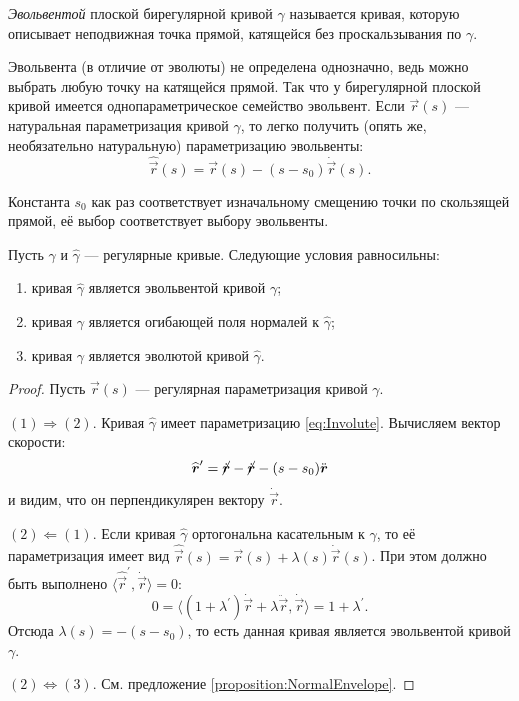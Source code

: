 \begin{definition}
	\textit{Эвольвентой} плоской бирегулярной кривой $\gamma$ называется кривая, которую описывает неподвижная точка прямой, катящейся без проскальзывания по $\gamma$.
\end{definition}

Эвольвента (в отличие от эволюты) не определена однозначно, ведь можно выбрать любую точку на катящейся прямой. Так что у бирегулярной плоской кривой имеется однопараметрическое семейство эвольвент. Если $\vec{r}(s)$ --- натуральная параметризация кривой $\gamma$, то легко получить (опять же, необязательно натуральную) параметризацию эвольвенты:
\begin{equation} \label{eq:Involute}
	\widehat{\vec{r}}(s) = \vec{r}(s) - (s - s_0)\dot{\vec{r}}(s).
\end{equation}

Константа $s_0$ как раз соответствует изначальному смещению точки по скользящей прямой, её выбор соответствует выбору эвольвенты.

\begin{theorem}
	Пусть $\gamma$ и $\widehat{\gamma}$ --- регулярные кривые. Следующие условия равносильны:
	\begin{enumerate}[nolistsep, label=(\arabic*)]
		\item кривая $\widehat{\gamma}$ является эвольвентой кривой $\gamma$;
		\item кривая $\gamma$ является огибающей поля нормалей к $\widehat{\gamma}$;
		\item кривая $\gamma$ является эволютой кривой $\widehat{\gamma}$.
	\end{enumerate}
\end{theorem}

\begin{proof}
	Пусть $\vec{r}(s)$ --- регулярная параметризация кривой $\gamma$.

	$(1) \Rightarrow (2)$. Кривая $\widehat{\gamma}$ имеет параметризацию \eqref{eq:Involute}. Вычисляем вектор скорости:
	\[
		\widehat{\vec{r}}^\prime = \cancel{\dot{\vec{r}}} - \cancel{\dot{\vec{r}}} - (s - s_0)\ddot{\vec{r}}
	\]
	и видим, что он перпендикулярен вектору $\dot{\vec{r}}$.

	$(2) \Leftarrow (1)$. Если кривая $\widehat{\gamma}$ ортогональна касательным к $\gamma$, то её параметризация имеет вид $\widehat{\vec{r}}(s) = \vec{r}(s) + \lambda(s)\dot{\vec{r}}(s)$. При этом должно быть выполнено $\langle\widehat{\vec{r}}^\prime, \dot{\vec{r}}\rangle = 0$:
	\[
		0 = \langle (1 + \lambda^\prime)\dot{\vec{r}} + \lambda\ddot{\vec{r}}, \dot{\vec{r}}\rangle = 1 + \lambda^\prime.
	\]
	Отсюда $\lambda(s) = -(s - s_0)$, то есть данная кривая является эвольвентой кривой $\gamma$.

	$(2) \Leftrightarrow (3)$. См. предложение \ref{proposition:NormalEnvelope}.
\end{proof}


